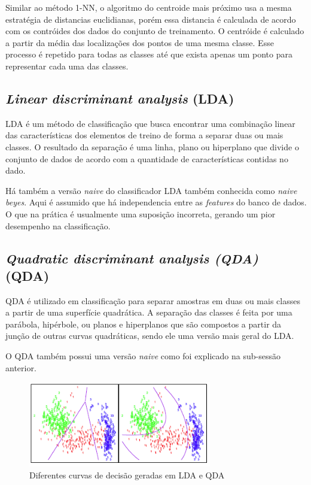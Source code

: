 \documentclass[paper=a4, fontsize=11pt]{scrartcl}
\numberwithin{equation}{section}		%
\numberwithin{figure}{section}			%
\numberwithin{table}{section}				%
\begin{document}
Similar ao método 1-NN, o algoritmo do centroide mais próximo usa a mesma estratégia de distancias euclidianas, porém essa distancia é calculada de acordo com os contróides dos dados do conjunto de treinamento. O centróide é calculado a partir da média das localizações dos pontos de uma mesma classe. Esse processo é repetido para todas as classes até que exista apenas um ponto para representar cada uma das classes.

\subsection{\textit{Linear discriminant analysis} (LDA)}

LDA é um método de classificação que busca encontrar uma combinação linear das características dos elementos de treino de forma a separar duas ou mais classes. O resultado da separação é uma linha, plano ou hiperplano que divide o conjunto de dados de acordo com a quantidade de características contidas no dado.

Há também a versão \textit{naive} do classificador LDA também conhecida como \textit{naive beyes}. Aqui é assumido que há independencia entre as \textit{features} do banco de dados. O que na prática é usualmente uma suposição incorreta, gerando um pior desempenho na classificação.

\subsection{\textit{Quadratic discriminant analysis (QDA)} (QDA)}

QDA é utilizado em classificação para separar amostras em duas ou mais classes a partir de uma superfície quadrática. A separação das classes é feita por uma parábola, hipérbole, ou planos e hiperplanos que são compostos a partir da junção de outras curvas quadráticas, sendo ele uma versão mais geral do LDA.

O QDA também possui uma versão \textit{naive} como foi explicado na sub-sessão anterior.

\begin{figure}[h]
    \includegraphics[width=8cm]{img/LDAQDA.png}
    \centering
    \caption{Diferentes curvas de decisão geradas em LDA e QDA}
    \label{fig:ldaqda}
\end{figure}
\end{document}
